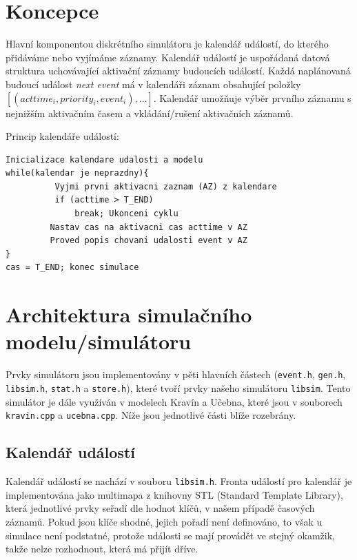 \documentclass[12pt,a4paper,titlepage,final]{article}
\begin{document}
\section{Koncepce}

Hlavní komponentou diskrétního simulátoru je kalendář událostí, do kterého přidáváme nebo vyjímáme záznamy. 
Kalendář událostí je uspořádaná datová struktura uchovávající aktivační záznamy budoucích událostí. Každá naplánovaná budoucí událost \emph{next event} má v kalendáři záznam obsahující položky $[(acttime_{i}, priority_{i}, event_{i}), \dots]$. Kalendář umožňuje výběr prvního záznamu s nejnižším aktivačním časem a vkládání/rušení aktivačních záznamů.

Princip kalendáře událostí:
\begin{lstlisting}[label={lst:myListing}]
Inicializace kalendare udalosti a modelu
while(kalendar je neprazdny){
          Vyjmi prvni aktivacni zaznam (AZ) z kalendare
          if (acttime > T_END)
              break; Ukonceni cyklu
         Nastav cas na aktivacni cas acttime v AZ
         Proved popis chovani udalosti event v AZ
}
cas = T_END; konec simulace
\end{lstlisting}

\section{Architektura simulačního modelu/simulátoru}

Prvky simulátoru jsou implementovány v pěti hlavních částech (\texttt{event.h}, \texttt{gen.h}, \texttt{libsim.h}, \texttt{stat.h} a \texttt{store.h}), které tvoří prvky našeho simulátoru \texttt{libsim}. Tento simulátor je dále využíván v modelech Kravín a Učebna, které jsou v souborech \texttt{kravin.cpp} a \texttt{ucebna.cpp}. Níže jsou jednotlivé části blíže rozebrány.
 
\subsection{Kalendář událostí}

Kalendář událostí se nachází v souboru \texttt{libsim.h}. Fronta událostí pro kalendář je implementována jako multimapa z knihovny STL (Standard Template Library), která jednotlivé prvky seřadí dle hodnot klíčů, v našem případě časových záznamů. Pokud jsou klíče shodné, jejich pořadí není definováno, to však u simulace není podstatné, protože události se mají provádět ve stejný okamžik, takže nelze rozhodnout, která má přijít dříve.
\end{document}
